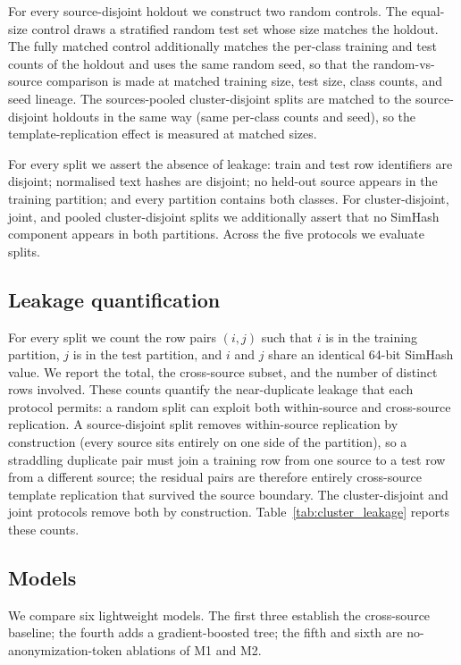 \documentclass[conference]{IEEEtran}
\begin{document}
For every source-disjoint holdout we construct two random controls. The equal-size control draws a stratified random test set whose size matches the holdout. The fully matched control additionally matches the per-class training and test counts of the holdout and uses the same random seed, so that the random-vs-source comparison is made at matched training size, test size, class counts, and seed lineage. The sources-pooled cluster-disjoint splits are matched to the source-disjoint holdouts in the same way (same per-class counts and seed), so the template-replication effect is measured at matched sizes.

For every split we assert the absence of leakage: train and test row identifiers are disjoint; normalised text hashes are disjoint; no held-out source appears in the training partition; and every partition contains both classes. For cluster-disjoint, joint, and pooled cluster-disjoint splits we additionally assert that no SimHash component appears in both partitions. Across the five protocols we evaluate \NSplits{} splits.



\subsection{Leakage quantification}
For every split we count the row pairs $(i,j)$ such that $i$ is in the training partition, $j$ is in the test partition, and $i$ and $j$ share an identical 64-bit SimHash value. We report the total, the cross-source subset, and the number of distinct rows involved. These counts quantify the near-duplicate leakage that each protocol permits: a random split can exploit both within-source and cross-source replication. A source-disjoint split removes within-source replication by construction (every source sits entirely on one side of the partition), so a straddling duplicate pair must join a training row from one source to a test row from a different source; the residual pairs are therefore entirely cross-source template replication that survived the source boundary. The cluster-disjoint and joint protocols remove both by construction. Table~\ref{tab:cluster_leakage} reports these counts.



\subsection{Models}
We compare six lightweight models. The first three establish the cross-source baseline; the fourth adds a gradient-boosted tree; the fifth and sixth are no-anonymization-token ablations of M1 and M2.
\end{document}

